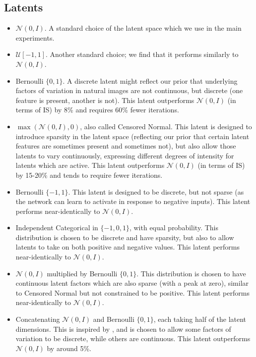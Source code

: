 \subsection*{Latents}
\begin{itemize}
\item $\mathcal{N}(0, I)$. A standard choice of the latent space which we use in the main experiments.

\item $\mathcal{U}[-1, 1]$. Another standard choice; we find that it performs similarly to $\mathcal{N}(0, I)$.

\item Bernoulli $\{0, 1\}$. A discrete latent might reflect our prior that underlying factors of variation in natural images are not continuous, but discrete (one feature is present, another is not). This latent outperforms $\mathcal{N}(0, I)$ (in terms of IS) by 8\% and requires 60\% fewer iterations.

\item $\max\left(\mathcal{N}(0, I), 0\right)$, also called Censored Normal. This latent is designed to introduce sparsity in the latent space (reflecting our prior that certain latent features are sometimes present and sometimes not), but also allow those latents to vary continuously, expressing different degrees of intensity for latents which are active. This latent outperforms $\mathcal{N}(0, I)$ (in terms of IS) by 15-20\% and tends to require fewer iterations.


\item Bernoulli $\{-1, 1\}$. This latent is designed to be discrete, but not sparse (as the network can learn to activate in response to negative inputs). This latent performs near-identically to $\mathcal{N}(0, I)$.

\item Independent Categorical in $\{-1, 0, 1\}$, with equal probability. This distribution is chosen to be discrete and have sparsity, but also to allow latents to take on both positive and negative values. This latent performs near-identically to $\mathcal{N}(0, I)$.

\item $\mathcal{N}(0, I)$  multiplied by Bernoulli $\{0, 1\}$. This distribution is chosen to have continuous latent factors which are also sparse (with a peak at zero), similar to Censored Normal but not constrained to be positive. This latent performs near-identically to $\mathcal{N}(0, I)$.

\item Concatenating  $\mathcal{N}(0, I)$ and Bernoulli $\{0, 1\}$, each taking half of the latent dimensions. This is inspired by \citet{chen2016infogan}, and is chosen to allow some factors of variation to be discrete, while others are continuous. This latent outperforms $\mathcal{N}(0, I)$ by around 5\%.


\end{itemize}
